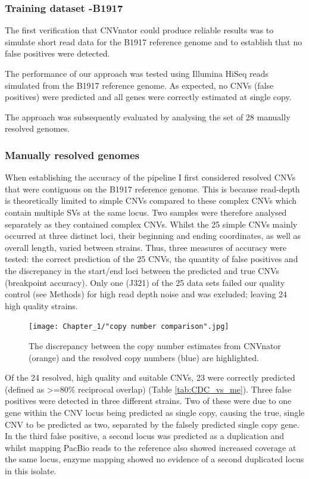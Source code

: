 \documentclass{article}
\begin{document}
\subsubsection{Training dataset -B1917}

The first verification that CNVnator could produce reliable results was to simulate short read data for the B1917 reference genome and to establish that no false positives were detected.

The performance of our approach was tested using Illumina HiSeq reads simulated from the B1917 reference genome. As expected, no CNVs (false positives) were predicted and all genes were correctly estimated at single copy. 

The approach was subsequently evaluated by analysing the set of 28 manually resolved genomes.

\subsubsection{Manually resolved genomes }

When establishing the accuracy of the pipeline I first considered resolved CNVs that were contiguous on the B1917 reference genome. This is because read-depth is theoretically limited to simple CNVs compared to these complex CNVs which contain multiple SVs at the same locus. Two samples were therefore analysed separately as they contained complex CNVs. Whilst the 25 simple CNVs mainly occurred at  three distinct loci, their beginning and ending coordinates, as well as overall length, varied between strains. Thus, three measures of accuracy were tested: the correct prediction of the 25 CNVs, the quantity of false positives and the discrepancy in the start/end loci between the predicted and true CNVs (breakpoint accuracy). Only one (J321) of the 25 data sets failed our quality control (see Methods) for high read depth noise and was excluded; leaving 24 high quality strains.



\begin{figure}[h!]
\centering
\texttt{[image: Chapter\_1/"copy number comparison".jpg]}
\caption{The discrepancy between the copy number estimates from CNVnator (orange) and the resolved copy numbers (blue) are highlighted.}
\label{fig:CDC_copy_number_discrep}
\end{figure}

Of the 24 resolved, high quality and suitable CNVs, 23 were correctly predicted (defined as >=80\% reciprocal overlap) (Table \ref{tab:CDC_vs_me}). Three false positives were detected in three different strains. Two of these were due to one gene within the CNV locus being predicted as single copy, causing the true, single CNV to be predicted as two, separated by the falsely predicted single copy gene.  In the third false positive, a second locus was predicted as a duplication and whilst mapping PacBio reads to the reference also showed increased coverage at the same locus, enzyme mapping showed no evidence of a second duplicated locus in this isolate. 
\end{document}
